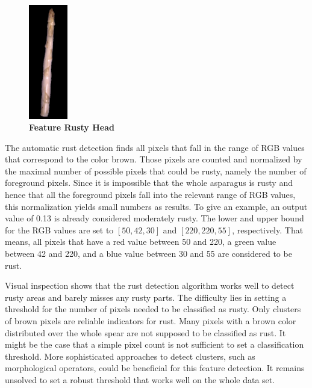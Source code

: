 \begin{figure}
  \begin{center}
    \includegraphics[width=0.15\textwidth]{Figures/chapter03/example_img_rustyhead.png}
  \end{center}
  \vspace{-15pt}
  \caption[Example Image Feature Rusty Head]{ \textbf{Feature Rusty Head}}
  \vspace{-10pt}
  \label{fig:ExampleRustyHead}
\end{figure}

\bigskip
The automatic rust detection finds all pixels that fall in the range of RGB values that correspond to the color brown. Those pixels are counted and normalized by the maximal number of possible pixels that could be rusty, namely the number of foreground pixels. Since it is impossible that the whole asparagus is rusty and hence that all the foreground pixels fall into the relevant range of RGB values, this normalization yields small numbers as results. To give an example, an output value of 0.13 is already considered moderately rusty. The lower and upper bound for the RGB values are set to $[50,42,30]$ and $[220,220,55]$, respectively. That means, all pixels that have a red value between 50 and 220, a green value between 42 and 220, and a blue value between 30 and 55 are considered to be rust.

\bigskip
Visual inspection shows that the rust detection algorithm works well to detect rusty areas and barely misses any rusty parts. The difficulty lies in setting a threshold for the number of pixels needed to be classified as rusty. Only clusters of brown pixels are reliable indicators for rust.  Many pixels with a brown color distributed over the whole spear are not supposed to be classified as rust. It might be the case that a simple pixel count is not sufficient to set a classification threshold. More sophisticated approaches to detect clusters, such as morphological operators, could be beneficial for this feature detection. It remains unsolved to set a robust threshold that works well on the whole data set.

